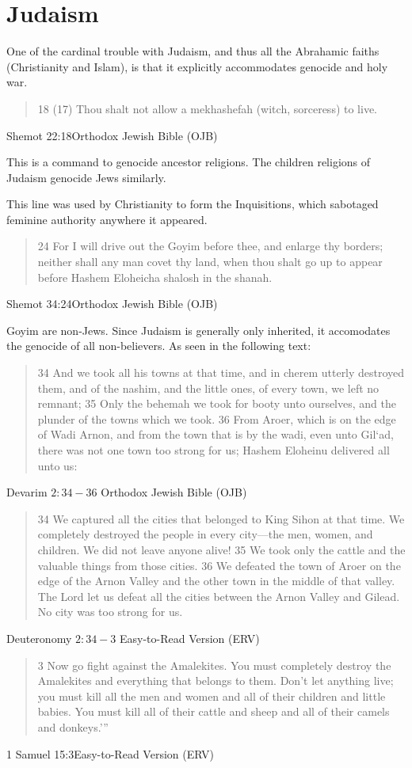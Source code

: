 \section{Judaism}
One of the cardinal trouble with Judaism, and thus all the Abrahamic faiths
(Christianity and Islam), is that
it explicitly accommodates genocide and holy war. 

\blockquote{18 (17) Thou shalt not allow a mekhashefah (witch, sorceress) to
live.}{Shemot 22:18Orthodox Jewish Bible (OJB)}

This is a command to genocide ancestor religions.
The children religions of Judaism genocide Jews similarly.

This line was used by Christianity to form the Inquisitions, which sabotaged
feminine authority anywhere it appeared. 

\blockquote{24 For I will drive out the Goyim before thee, and enlarge thy borders; 
neither shall any man covet thy land, when thou shalt go up to appear before 
Hashem Eloheicha shalosh in the shanah.
}{Shemot 34:24Orthodox Jewish Bible (OJB)}

Goyim are non-Jews.  Since Judaism is generally only inherited, it accomodates 
the genocide of all non-believers. As seen in the following text:

\blockquote{34 And we took all his towns at that time, and in cherem utterly
destroyed them, and of the nashim, and the little ones, of every town, we left
no remnant;
35 Only the behemah we took for booty unto ourselves, and the plunder of the
towns which we took.
36 From Aroer, which is on the edge of Wadi Arnon, and from the town that is by
the wadi, even unto Gil‘ad, there was not one town too strong for us; Hashem
Eloheinu delivered all unto us:
} {Devarim $2:34-36$ Orthodox Jewish Bible (OJB)}

\blockquote{34 We captured all the cities that belonged to King Sihon at that time. We
completely destroyed the people in every city—the men, women, and children. We
did not leave anyone alive! 35 We took only the cattle and the valuable things
from those cities. 36 We defeated the town of Aroer on the edge of the Arnon
Valley and the other town in the middle of that valley. The Lord let us defeat
all the cities between the Arnon Valley and Gilead. No city was too strong for
us. 
}{Deuteronomy $2:34-3$ Easy-to-Read Version (ERV)}

\blockquote{3 Now go fight against the Amalekites. You must completely destroy the
Amalekites and everything that belongs to them. Don’t let anything live; you
must kill all the men and women and all of their children and little babies. You
must kill all of their cattle and sheep and all of their camels and donkeys.’”}
{1 Samuel 15:3Easy-to-Read Version (ERV)}

